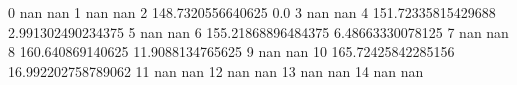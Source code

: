 0 nan nan
1 nan nan
2 148.7320556640625 0.0
3 nan nan
4 151.72335815429688 2.991302490234375
5 nan nan
6 155.21868896484375 6.48663330078125
7 nan nan
8 160.640869140625 11.9088134765625
9 nan nan
10 165.72425842285156 16.992202758789062
11 nan nan
12 nan nan
13 nan nan
14 nan nan
